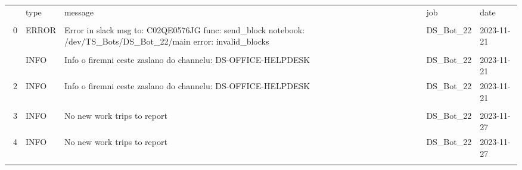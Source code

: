 \documentclass{article}
\date{20. listopadu 2023}
\begin{document}




\begin{tabular}{rllll} \hline   & type   & message                                                      & job       & date       \\\\ \hline  0 & ERROR  & Error in slack msg to: C02QE0576JG \n func: send\_block  notebook: /dev/TS\_Bots/DS\_Bot\_22/main  error: invalid\_blocks                                                              & DS\_Bot\_22 & 2023-11-21 \\\\\n  1 & INFO   & Info o firemni ceste zaslano do channelu: DS-OFFICE-HELPDESK & DS\_Bot\_22 & 2023-11-21 \\\  2 & INFO   & Info o firemni ceste zaslano do channelu: DS-OFFICE-HELPDESK & DS\_Bot\_22 & 2023-11-21 \\\\ 3 & INFO   & No new work trips to report                                  & DS\_Bot\_22 & 2023-11-27 \\\  4 & INFO   & No new work trips to report                                  & DS\_Bot\_22 & 2023-11-27 \\\\ \hline
\end{tabular}
\end{document}
